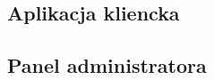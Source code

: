 \documentclass[../../deliverable-two.tex]{subfiles}
\begin{document}
\subsection{Aplikacja kliencka}

\subsection{Panel administratora}
\end{document}
